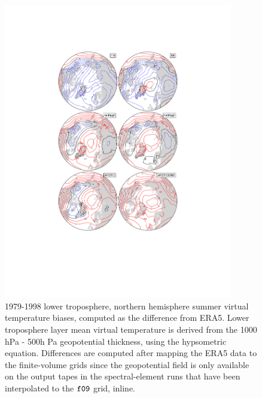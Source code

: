 \documentclass[draft]{agujournal2019}
\begin{document}
\begin{figure}[t]
\begin{center}
         \includegraphics[width=100mm]{temp_contours_diffERA5_Thyps.pdf}
\end{center}
\caption{1979-1998 lower troposphere, northern hemisphere summer virtual temperature biases, computed as the difference from ERA5. Lower troposphere layer mean virtual temperature is derived from the 1000 hPa - 500h Pa geopotential thickness, using the hypsometric equation. Differences are computed after mapping the ERA5 data to the finite-volume grids since the geopotential field is only available on the output tapes in the spectral-element runs that have been interpolated to the $\tt f09$ grid, inline.}
\label{fig:dThyps}
\end{figure}
\end{document}
